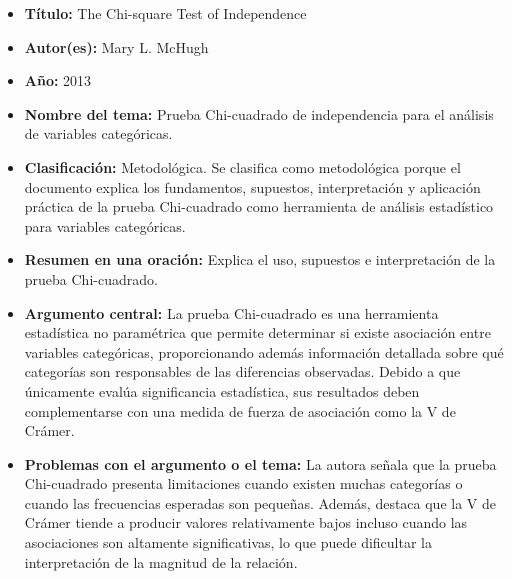 \documentclass[12pt]{article}
\begin{document}
\begin{itemize}
    \item \textbf{Título:} The Chi-square Test of Independence
    \item \textbf{Autor(es):} Mary L. McHugh
    \item \textbf{Año:} 2013
    \item \textbf{Nombre del tema:} Prueba Chi-cuadrado de independencia para el análisis de variables categóricas.
    \item \textbf{Clasificación:} Metodológica. Se clasifica como metodológica porque el documento explica los fundamentos, 
    supuestos, interpretación y aplicación práctica de la prueba Chi-cuadrado como herramienta de análisis estadístico para 
    variables categóricas.
    \item \textbf{Resumen en una oración:} Explica el uso, supuestos e interpretación de la prueba Chi-cuadrado.
    \item \textbf{Argumento central:} La prueba Chi-cuadrado es una herramienta estadística no paramétrica que 
    permite determinar si existe asociación entre variables categóricas, proporcionando además información detallada 
    sobre qué categorías son responsables de las diferencias observadas. Debido a que únicamente evalúa significancia 
    estadística, sus resultados deben complementarse con una medida de fuerza de asociación como la V de Crámer.
    \item \textbf{Problemas con el argumento o el tema:} La autora señala que la prueba Chi-cuadrado presenta limitaciones 
    cuando existen muchas categorías o cuando las frecuencias esperadas son pequeñas. Además, destaca que la V de Crámer 
    tiende a producir valores relativamente bajos incluso cuando las asociaciones son altamente significativas, 
    lo que puede dificultar la interpretación de la magnitud de la relación.\\
\end{itemize}
\end{document}
